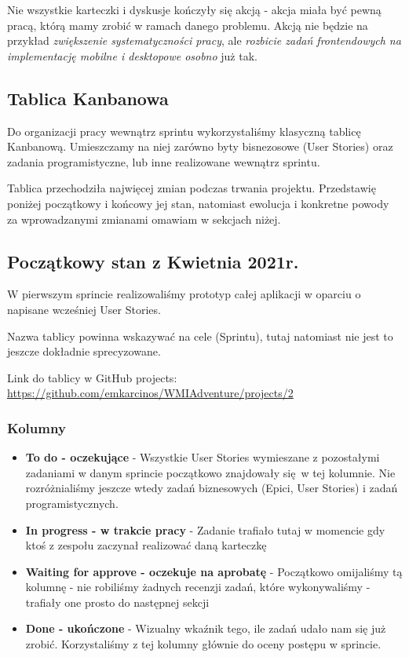 \documentclass{article}
\begin{document}
Nie wszystkie karteczki i dyskusje kończyły się akcją - akcja miała być pewną pracą, którą mamy zrobić w ramach danego problemu. Akcją nie będzie na przykład \textit{zwiększenie systematyczności pracy}, ale \textit{rozbicie zadań frontendowych na implementację mobilne i desktopowe osobno} już tak.

\subsection{Tablica Kanbanowa}
Do organizacji pracy wewnątrz sprintu wykorzystaliśmy klasyczną tablicę Kanbanową. Umieszczamy na niej zarówno byty bisnezosowe (User Stories) oraz zadania programistyczne, lub inne realizowane wewnątrz sprintu.

Tablica przechodziła najwięcej zmian podczas trwania projektu. Przedstawię poniżej początkowy i końcowy jej stan, natomiast ewolucja i konkretne powody za wprowadzanymi zmianami omawiam w sekcjach niżej.

\subsection*{Początkowy stan z Kwietnia 2021r.}
W pierwszym sprincie realizowaliśmy prototyp całej aplikacji w oparciu o napisane wcześniej User Stories.

Nazwa tablicy powinna wskazywać na cele (Sprintu), tutaj natomiast nie jest to jeszcze dokładnie sprecyzowane.

Link do tablicy w GitHub projects: \url{
    https://github.com/emkarcinos/WMIAdventure/projects/2}
\subsubsection*{Kolumny}
\begin{itemize}
    \item \textbf{To do - oczekujące} - Wszystkie User Stories wymieszane z pozostałymi zadaniami w danym sprincie początkowo znajdowały się w tej kolumnie. Nie rozróżnialiśmy jeszcze wtedy zadań biznesowych (Epici, User Stories) i zadań programistycznych.
    \item \textbf{In progress - w trakcie pracy} - Zadanie trafiało tutaj w momencie gdy ktoś z zespołu zaczynał realizować daną karteczkę
    \item \textbf{Waiting for approve - oczekuje na aprobatę} - Początkowo omijaliśmy tą kolumnę - nie robiliśmy żadnych recenzji zadań, które wykonywaliśmy - trafiały one prosto do następnej sekcji
    \item \textbf{Done - ukończone} - Wizualny wkaźnik tego, ile zadań udało nam się już zrobić. Korzystaliśmy z tej kolumny głównie do oceny postępu w sprincie.
\end{itemize}
\end{document}
